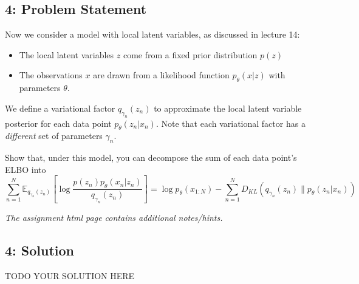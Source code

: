 \documentclass[10pt]{article}
\newcommand{\officialdirections}[1]{{\color{purple} #1}}
\begin{document}
\newpage
\officialdirections{
\subsection*{4: Problem Statement}
Now we consider a model with local latent variables, as discussed in lecture 14:

\begin{itemize}
\item The local latent variables $z$ come from a fixed prior distribution $p(z)$
\item The observations $x$ are drawn from a likelihood function $p_\theta(x|z)$ with parameters $\theta$.
\end{itemize}
We define a variational factor $q_{\gamma_n}(z_n)$ to approximate the local latent variable posterior for each data point $p_\theta(z_n|x_n)$. Note that each variational factor has a \emph{different} set of parameters $\gamma_n$.

Show that, under this model, you can decompose the sum of each data point's ELBO into
\begin{equation*}
\sum_{n=1}^N \mathbb{E}_{q_{\gamma_n}(z_n)}\left[\log \frac{p(z_n)p_\theta(x_n|z_n)}{q_{\gamma_n}(z_n)}\right] = \log p_\theta(x_{1:N}) - \sum_{n=1}^N D_{KL}(q_{\gamma_n}(z_n) \lVert p_\theta(z_n|x_n))
\end{equation*}

\emph{The assignment html page contains additional notes/hints.}
}

\subsection{4: Solution}

TODO YOUR SOLUTION HERE
\end{document}
